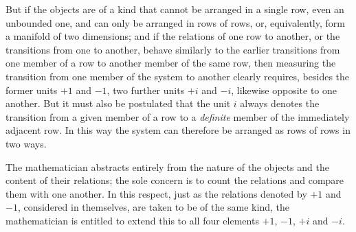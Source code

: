 But if the objects are of a kind that cannot be arranged in a single row, even an unbounded one, and can only be arranged in rows of rows, or, equivalently, form a manifold of two dimensions; and if the relations of one row to another, or the transitions from one to another, behave similarly to the earlier transitions from one member of a row to another member of the same row, then measuring the transition from one member of the system to another clearly requires, besides the former units $+1$ and $-1$, two further units $+i$ and $-i$, likewise opposite to one another. But it must also be postulated that the unit $i$ always denotes the transition from a given member of a row to a \emph{definite} member of the immediately adjacent row. In this way the system can therefore be arranged as rows of rows in two ways.

The mathematician abstracts entirely from the nature of the objects and the content of their relations; the sole concern is to count the relations and compare them with one another. In this respect, just as the relations denoted by $+1$ and $-1$, considered in themselves, are taken to be of the same kind, the mathematician is entitled to extend this to all four elements $+1$, $-1$, $+i$ and $-i$.

